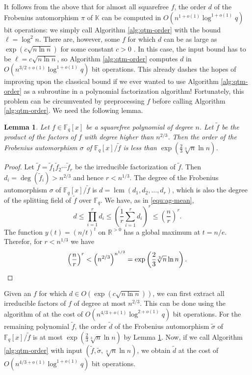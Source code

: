\documentclass[11pt]{article}
\theoremstyle{plain}
\newtheorem{lemma}[theorem]{Lemma}
\theoremstyle{definition}
\DeclareMathOperator{\lcm}{lcm} %
\def\K{\ensuremath{\mathbb{K}}}
\def\R{\ensuremath{\mathbb{R}}}
\def\F{\ensuremath{\mathbb{F}}}
\begin{document}
It follows from the above that for almost all squarefree $f$, the order $d$ of the Frobenius 
automorphism $\pi$ of $\K$ can be computed in $O(n^{1 + o(1)}\log^{1 + o(1)}q)$ bit operations: we 
simply call Algorithm \ref{alg:qtm-order} with the bound $\ell = \log^2n$. There are, however, some 
$f$ for which $d$ can be as large as $\exp(c\sqrt{n \ln n})$ for some constant $c > 0$ 
\cite{erdos1965some}. In this case, the input bound has to be $\ell = c\sqrt{n \ln n}$, so Algorithm 
\ref{alg:qtm-order} computes $d$ in $O(n^{3/2 + o(1)}\log^{1 + o(1)}q)$ bit operations. This already 
dashes the hopes of improving upon the classical bound if we ever wanted to use Algorithm 
\ref{alg:qtm-order} as a subroutine in a polynomial factorization algorithm! Fortunately, this 
problem can be circumvented by preprocessing $f$ before calling Algorithm \ref{alg:qtm-order}. 
We need the following lemma.
\begin{lemma}
\label{lem:frob-sub-ord}
	Let $f \in \F_q[x]$ be a squarefree polynomial of degree $n$. Let $\tilde{f}$ be the product of 
	the factors of $f$ with degree higher than $n^{2 / 3}$. Then the order of the Frobenius 
	automorphism $\sigma$ of $\F_q[x] / \tilde{f}$ is less than $\exp(\frac{2}{3}\sqrt[3]{n} \ln 
	n)$.
\end{lemma}
\begin{proof}
	Let $\tilde{f} = \tilde{f}_1\tilde{f}_2 \cdots \tilde{f}_r$ be the irreducible factorization of 
	$\tilde{f}$. Then $d_i = \deg(\tilde{f}_i) > n^{2 / 3}$ and hence $r < n^{1 / 3}$. The degree 
	of the Frobenius automorphism $\sigma$ of $\F_q[x] / \tilde{f}$ is $d = \lcm(d_1, d_2, \dots, 
	d_r)$, which is also the degree of the splitting field of $\tilde{f}$ over $\F_q$. We have, as 
	in 
	\eqref{equ:ag-mean},
	\[ d \le \prod_{i = 1}^rd_i \le \left( \frac{1}{r} \sum_{i = 1}^rd_i \right)^r \le \left( 
	\frac{n}{r} \right)^r. \]
	The function $y(t) = (n / t)^t$ on $\R^{> 0}$ has a global maximum at $t = n / e$. Therefor, 
	for $r < n^{1/3}$ we have
	\[ \left( \frac{n}{r} \right)^r < \left( n^{2 / 3} \right)^{n^{1 / 3}} = \exp\left( \frac{2}{3} 
	\sqrt[3]{n} \ln n \right). \qedhere \]
\end{proof}
Given an $f$ for which $d \in O(\exp(c\sqrt{n \ln n}))$, we can first extract all irreducible 
factors of $f$ of degree at most $n^{2 / 3}$. This can be done using the algorithm of \cite[\S 
8]{kedlaya2011fast} at the cost of $O(n^{4 / 3 + o(1)}\log^{2 + o(1)}q)$ bit operations. For the 
remaining polynomial $\tilde{f}$, the order $\tilde{d}$ of the Frobenius automorphism 
$\tilde{\sigma}$ of $\F_q[x] / \tilde{f}$ is at most $\exp(\frac{2}{3}\sqrt[3]{n} \ln n)$ by Lemma 
\ref{lem:frob-sub-ord}. Now, if we call Algorithm \ref{alg:qtm-order} with input $(\tilde{f}, 
\tilde{\sigma}, \sqrt[3]{n} \ln n)$, we obtain $\tilde{d}$ at the cost of $O(n^{4 / 3 + o(1)}\log^{1 
+ o(1)}q)$ bit operations.
\end{document}
